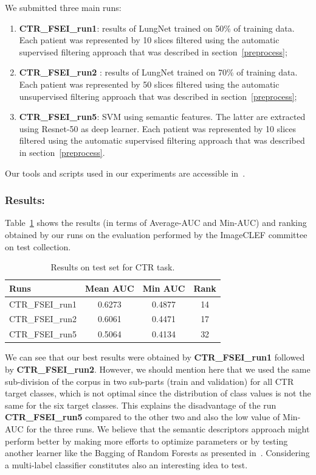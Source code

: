 \documentclass{llncs}
\begin{document}
We submitted three main runs:
\begin{enumerate}
\item  \textbf{CTR\_FSEI\_run1}:  results of LungNet trained on 50\% of training data. Each patient was represented by 10 slices filtered using the automatic supervised filtering approach that was described in section~\ref{preprocess};
\item  \textbf{CTR\_FSEI\_run2} :  results of LungNet trained on 70\% of training data. Each patient was represented by 50 slices filtered using the automatic unsupervised filtering approach that was described in section~\ref{preprocess};
\item  \textbf{CTR\_FSEI\_run5}: SVM using semantic features. The latter are extracted using Resnet-50 as deep learner. Each patient was represented by 10 slices filtered using the automatic supervised filtering approach that was described in section~\ref{preprocess}.\\
\end{enumerate}

Our tools and scripts used in our experiments are accessible in~\cite{anouargit}.

\subsubsection{Results:}


Table~\ref{tab:resultstestctr} shows the results (in terms of Average-AUC and Min-AUC) and ranking obtained by our runs on the evaluation performed by the ImageCLEF committee on test collection.\\

\begin{table}
\center
\caption{Results on test set for CTR task.}
\label{tab:resultstestctr}
\begin{tabular}{|l||c||c||c|}
\hline
Runs					&	Mean AUC	&	Min AUC	&	Rank		\\
\hline
CTR\_FSEI\_run1				& 	0.6273		&	0.4877	&	14		\\
CTR\_FSEI\_run2				& 	0.6061		&	0.4471	&	17		\\
CTR\_FSEI\_run5				& 	0.5064		&	0.4134	&	32		\\
\hline
\end{tabular}
\end{table}

We can see that our best results were obtained by  \textbf{CTR\_FSEI\_run1} followed by  \textbf{CTR\_FSEI\_run2}. However, we should mention here that we used the same sub-division of the corpus in two sub-parts (train and validation) for all CTR target classes, which is not optimal since the distribution of class values is not the same for the six target classes. This explains the disadvantage of the run \textbf{CTR\_FSEI\_run5} compared to the other two and also the low value of Min-AUC for the three runs. We believe that the semantic descriptors approach might perform better by making more efforts to optimize parameters or by testing another learner like the Bagging of Random Forests as presented in~\cite{HamadiY18}. Considering a multi-label classifier constitutes also an interesting idea to test.\\
\end{document}
